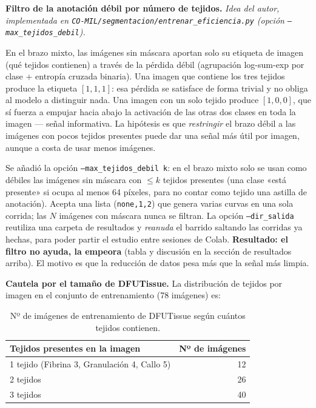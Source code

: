 \documentclass[12pt,letterpaper]{report}
\newcommand{\entrada}[2]{%
    \vspace{0.6em}
    \noindent\textbf{#1.} \textit{#2}
    \vspace{0.3em}
    \par
}
\begin{document}
\entrada{Filtro de la anotación débil por número de tejidos}{Idea del autor, implementada en
\texttt{CO-MIL/segmentacion/entrenar\_eficiencia.py} (opción \texttt{--max\_tejidos\_debil}).}

En el brazo mixto, las imágenes sin máscara aportan solo su etiqueta de imagen (qué tejidos
contienen) a través de la pérdida débil (agrupación log-sum-exp por clase + entropía cruzada
binaria). Una imagen que contiene los tres tejidos produce la etiqueta $[1,1,1]$: esa pérdida se
satisface de forma trivial y no obliga al modelo a distinguir nada. Una imagen con un solo tejido
produce $[1,0,0]$, que sí fuerza a empujar hacia abajo la activación de las otras dos clases en toda
la imagen --- señal informativa. La hipótesis es que \emph{restringir} el brazo débil a las imágenes
con pocos tejidos presentes puede dar una señal más útil por imagen, aunque a costa de usar menos
imágenes.

Se añadió la opción \texttt{--max\_tejidos\_debil k}: en el brazo mixto solo se usan como débiles las
imágenes sin máscara con $\leq k$ tejidos presentes (una clase «está presente» si ocupa al menos 64
píxeles, para no contar como tejido una astilla de anotación). Acepta una lista
(\texttt{none,1,2}) que genera varias curvas en una sola corrida; las $N$ imágenes con máscara nunca
se filtran. La opción \texttt{--dir\_salida} reutiliza una carpeta de resultados y \emph{reanuda} el
barrido saltando las corridas ya hechas, para poder partir el estudio entre sesiones de Colab.
\textbf{Resultado: el filtro no ayuda, la empeora} (tabla y discusión en la sección de resultados
arriba). El motivo es que la reducción de datos pesa más que la señal más limpia.

\textbf{Cautela por el tamaño de DFUTissue.} La distribución de tejidos por imagen en el conjunto de
entrenamiento (78 imágenes) es:

\begin{table}[H]
\centering
\caption{Nº de imágenes de entrenamiento de DFUTissue según cuántos tejidos contienen.}
\begin{tabular}{lr}
\toprule
Tejidos presentes en la imagen & Nº de imágenes \\
\midrule
1 tejido (Fibrina 3, Granulación 4, Callo 5) & 12 \\
2 tejidos & 26 \\
3 tejidos & 40 \\
\bottomrule
\end{tabular}
\end{table}
\end{document}
